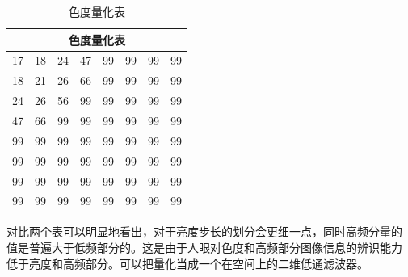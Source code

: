 \documentclass{article}
\numberwithin {equation}{section}
\begin{document}
\begin{spacing}{1.25}
    \begin{table}[H]
      \caption{色度量化表}
      \label{色度量化表}
      \centering
      \begin{tabular}{cccccccc}
        \toprule
        \multicolumn{8}{c}{色度量化表}\\
        \midrule
        17 & 18 & 24 & 47 & 99 & 99 & 99 & 99 \\
        18 & 21 & 26 & 66 & 99 & 99 & 99 & 99 \\
        24 & 26 & 56 & 99 & 99 & 99 & 99 & 99 \\
        47 & 66 & 99 & 99 & 99 & 99 & 99 & 99 \\
        99 & 99 & 99 & 99 & 99 & 99 & 99 & 99 \\
        99 & 99 & 99 & 99 & 99 & 99 & 99 & 99 \\
        99 & 99 & 99 & 99 & 99 & 99 & 99 & 99 \\
        99 & 99 & 99 & 99 & 99 & 99 & 99 & 99 \\
        \bottomrule
      \end{tabular}
    \end{table}

    对比两个表可以明显地看出，对于亮度步长的划分会更细一点，同时高频分量的
    值是普遍大于低频部分的。这是由于人眼对色度和高频部分图像信息的辨识能力
    低于亮度和高频部分。可以把量化当成一个在空间上的二维低通滤波器。

\end{spacing}
\end{document}
